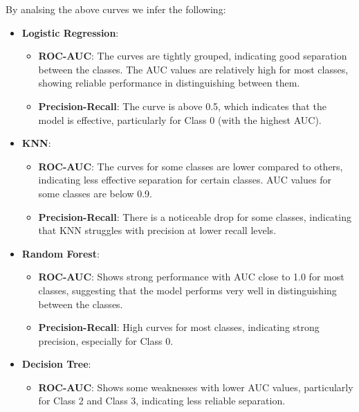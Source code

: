 \documentclass[12pt]{report}
\begin{document}
By analsing the above curves we infer the following:
\vspace{-1.25em}
\begin{itemize}
	\setlength\itemsep{-1.5em}
		\item \textbf{Logistic Regression}:
		\vspace{-1.25em}	
		\begin{itemize}
					\setlength\itemsep{-1.5em}
					\item \textbf{ROC-AUC}: The curves are tightly grouped, indicating good separation between the classes. The AUC values are relatively high for most classes, showing reliable performance in distinguishing between them.
					\item \textbf{Precision-Recall}: The curve is above 0.5, which indicates that the model is effective, particularly for Class 0 (with the highest AUC).
			\end{itemize}
		\item \textbf{KNN}:
		\vspace{-1.25em}	
		\begin{itemize}
					\setlength\itemsep{-1.5em}
					\item \textbf{ROC-AUC}: The curves for some classes are lower compared to others, indicating less effective separation for certain classes. AUC values for some classes are below 0.9.
					\item \textbf{Precision-Recall}: There is a noticeable drop for some classes, indicating that KNN struggles with precision at lower recall levels.
				\end{itemize}
		\item \textbf{Random Forest}:
		\vspace{-1.25em}	
		\begin{itemize}
				\setlength\itemsep{-1.5em}
        \item \textbf{ROC-AUC}: Shows strong performance with AUC close to 1.0 for most classes, suggesting that the model performs very well in distinguishing between the classes.
        \item \textbf{Precision-Recall}: High curves for most classes, indicating strong precision, especially for Class 0.
			\end{itemize}
		\item \textbf{Decision Tree}:
		\vspace{-1.25em}	
		\begin{itemize}
				\setlength\itemsep{-1.5em}
        \item \textbf{ROC-AUC}: Shows some weaknesses with lower AUC values, particularly for Class 2 and Class 3, indicating less reliable separation.

\end{itemize}
\end{itemize}
\end{document}
